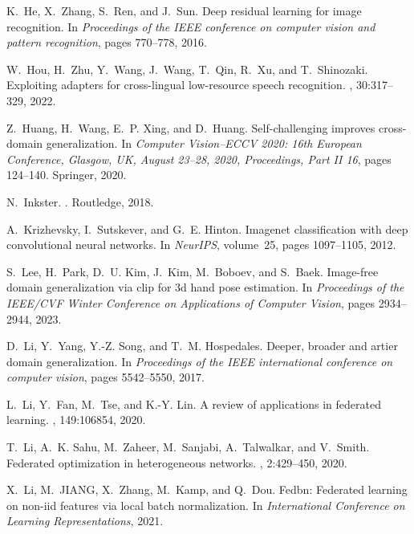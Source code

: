 \documentclass[11pt]{article}
\begin{document}
\begin{thebibliography}{10}
K.~He, X.~Zhang, S.~Ren, and J.~Sun.
\newblock Deep residual learning for image recognition.
\newblock In {\em Proceedings of the IEEE conference on computer vision and
  pattern recognition}, pages 770--778, 2016.

W.~Hou, H.~Zhu, Y.~Wang, J.~Wang, T.~Qin, R.~Xu, and T.~Shinozaki.
\newblock Exploiting adapters for cross-lingual low-resource speech
  recognition.
, 30:317--329,
  2022.

Z.~Huang, H.~Wang, E.~P. Xing, and D.~Huang.
\newblock Self-challenging improves cross-domain generalization.
\newblock In {\em Computer Vision--ECCV 2020: 16th European Conference,
  Glasgow, UK, August 23--28, 2020, Proceedings, Part II 16}, pages 124--140.
  Springer, 2020.

N.~Inkster.
.
\newblock Routledge, 2018.

A.~Krizhevsky, I.~Sutskever, and G.~E. Hinton.
\newblock Imagenet classification with deep convolutional neural networks.
\newblock In {\em NeurIPS}, volume~25, pages 1097--1105, 2012.

S.~Lee, H.~Park, D.~U. Kim, J.~Kim, M.~Boboev, and S.~Baek.
\newblock Image-free domain generalization via clip for 3d hand pose
  estimation.
\newblock In {\em Proceedings of the IEEE/CVF Winter Conference on Applications
  of Computer Vision}, pages 2934--2944, 2023.

D.~Li, Y.~Yang, Y.-Z. Song, and T.~M. Hospedales.
\newblock Deeper, broader and artier domain generalization.
\newblock In {\em Proceedings of the IEEE international conference on computer
  vision}, pages 5542--5550, 2017.

L.~Li, Y.~Fan, M.~Tse, and K.-Y. Lin.
\newblock A review of applications in federated learning.
, 149:106854, 2020.

T.~Li, A.~K. Sahu, M.~Zaheer, M.~Sanjabi, A.~Talwalkar, and V.~Smith.
\newblock Federated optimization in heterogeneous networks.
, 2:429--450, 2020.

X.~Li, M.~JIANG, X.~Zhang, M.~Kamp, and Q.~Dou.
\newblock Fedbn: Federated learning on non-iid features via local batch
  normalization.
\newblock In {\em International Conference on Learning Representations}, 2021.


\end{thebibliography}
\end{document}
